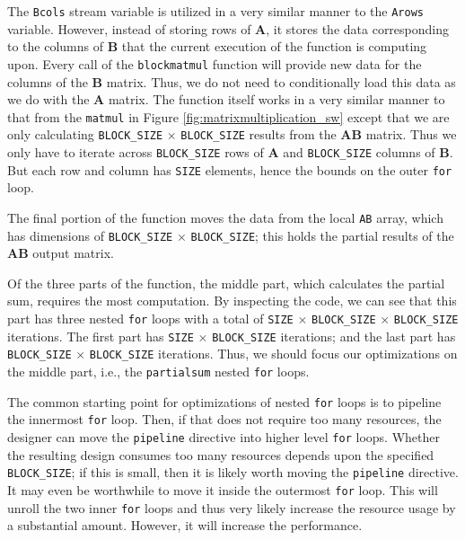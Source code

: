 The \lstinline{Bcols} stream variable is utilized in a very similar manner to the \lstinline{Arows} variable. However, instead of storing rows of $\mathbf{A}$, it stores the data corresponding to the columns of $\mathbf{B}$ that the current execution of the function is computing upon. Every call of the \lstinline{blockmatmul} function will provide new data for the columns of the $\mathbf{B}$ matrix. Thus, we do not need to conditionally load this data as we do with the $\mathbf{A}$ matrix. The function itself works in a very similar manner to that from the \lstinline{matmul} in Figure \ref{fig:matrixmultiplication_sw} except that we are only calculating \lstinline{BLOCK_SIZE} $\times$ \lstinline{BLOCK_SIZE} results from the $\mathbf{AB}$ matrix. Thus we only have to iterate across \lstinline{BLOCK_SIZE} rows of $\mathbf{A}$ and \lstinline{BLOCK_SIZE} columns of $\mathbf{B}$. But each row and column has \lstinline{SIZE} elements, hence the bounds on the outer \lstinline{for} loop. 

The final portion of the function moves the data from the local \lstinline{AB} array, which has dimensions of \lstinline{BLOCK_SIZE} $\times$ \lstinline{BLOCK_SIZE}; this holds the partial results of the $\mathbf{AB}$ output matrix. %

Of the three parts of the function, the middle part, which calculates the partial sum, requires the most computation. By inspecting the code, we can see that this part has three nested \lstinline{for} loops with a total of \lstinline{SIZE} $\times$ \lstinline{BLOCK_SIZE} $\times$ \lstinline{BLOCK_SIZE} iterations. The first part has \lstinline{SIZE} $\times$ \lstinline{BLOCK_SIZE} iterations; and the last part has \lstinline{BLOCK_SIZE} $\times$ \lstinline{BLOCK_SIZE} iterations. Thus, we should focus our optimizations on the middle part, i.e., the \lstinline{partialsum} nested \lstinline{for} loops.

The common starting point for optimizations of nested \lstinline{for} loops is to pipeline the innermost \lstinline{for} loop. Then, if that does not require too many resources, the designer can move the \lstinline{pipeline} directive into higher level \lstinline{for} loops. Whether the resulting design consumes too many resources depends upon the specified \lstinline{BLOCK_SIZE}; if this is small, then it is likely worth moving the \lstinline{pipeline} directive. It may even be worthwhile to move it inside the outermost \lstinline{for} loop. This will unroll the two inner \lstinline{for} loops and thus very likely increase the resource usage by a substantial amount. However, it will increase the performance.

